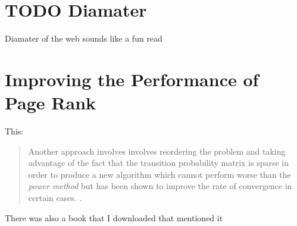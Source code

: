 \documentclass[11pt]{article}
\begin{document}
\section{TODO Diamater}
\label{sec:org283c3d8}
Diamater of the web sounds like a fun read \cite{albertDiameterWorldWideWeb1999}
\section{Improving the Performance of Page Rank}
\label{sec:orgaad11c2}

This:

\begin{quote}
Another approach involves involves reordering the problem and taking advantage
of the fact that the transition probability matrix is sparse  in order
to produce a new algorithm which cannot perform worse than the \emph{power method}
but has been shown to improve the rate of convergence in certain cases.
\cite{langvilleReorderingPageRankProblem2006}.
\end{quote}


There was also a book that I downloaded that mentioned it
\end{document}
